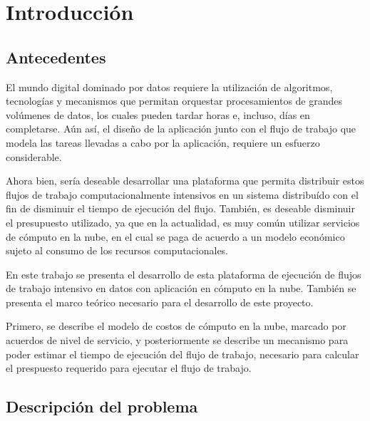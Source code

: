\chapter{Introducción}
\label{chap:intro}

\section{Antecedentes}

El mundo digital dominado por datos requiere la utilización de algoritmos, tecnologías y mecanismos que permitan orquestar procesamientos de grandes volúmenes de datos, los cuales pueden tardar horas e, incluso, días en completarse. Aún así, el diseño de la aplicación junto con el flujo de trabajo que modela las tareas llevadas a cabo por la aplicación, requiere un esfuerzo considerable.

Ahora bien, sería deseable desarrollar una plataforma que permita distribuir estos flujos de trabajo computacionalmente intensivos en un sistema distribuído con el fin de disminuir el tiempo de ejecución del flujo. También, es deseable disminuir el presupuesto utilizado, ya que en la actualidad, es muy común utilizar servicios de cómputo en la nube, en el cual se paga de acuerdo a un modelo económico sujeto al consumo de los recursos computacionales.

En este trabajo se presenta el desarrollo de esta plataforma de ejecución de flujos de trabajo intensivo en datos con aplicación en cómputo en la nube. También se presenta el marco teórico necesario para el desarrollo de este proyecto.

Primero, se describe el modelo de costos de cómputo en la nube, marcado por acuerdos de nivel de servicio, y posteriormente se describe un mecanismo para poder estimar el tiempo de ejecución del flujo de trabajo, necesario para calcular el prespuesto requerido para ejecutar el flujo de trabajo. 



\section{Descripción del problema}

